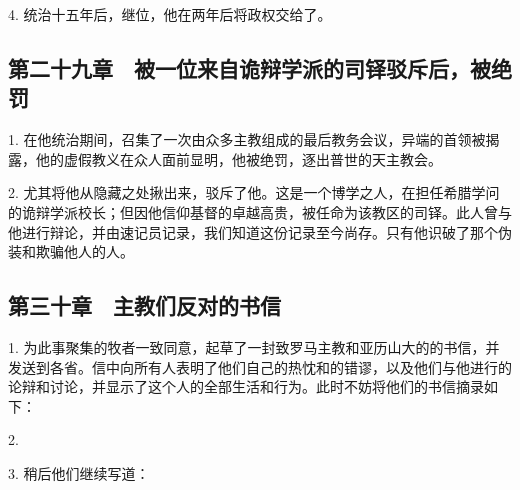 4. 统治十五年后，继位，他在两年后将政权交给了。\par


\subsection{第二十九章 被一位来自诡辩学派的司铎驳斥后，被绝罚}

1. 在他统治期间，召集了一次由众多主教组成的最后教务会议，异端的首领被揭露，他的虚假教义在众人面前显明，他被绝罚，逐出普世的天主教会。\par

2. 尤其将他从隐藏之处揪出来，驳斥了他。这是一个博学之人，在担任希腊学问的诡辩学派校长；但因他信仰基督的卓越高贵，被任命为该教区的司铎。此人曾与他进行辩论，并由速记员记录，我们知道这份记录至今尚存。只有他识破了那个伪装和欺骗他人的人。\par


\subsection{第三十章 主教们反对的书信}

1. 为此事聚集的牧者一致同意，起草了一封致罗马主教和亚历山大的的书信，并发送到各省。信中向所有人表明了他们自己的热忱和的错谬，以及他们与他进行的论辩和讨论，并显示了这个人的全部生活和行为。此时不妨将他们的书信摘录如下：\par

2. \par

3. 稍后他们继续写道：\par

